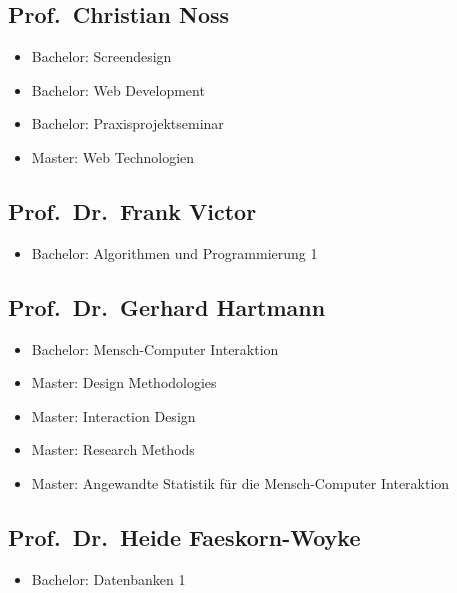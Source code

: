 \subsection{Prof.~Christian Noss}\label{prof.christian-noss}

\begin{itemize}
\tightlist
\item
  Bachelor: Screendesign
\item
  Bachelor: Web Development
\item
  Bachelor: Praxisprojektseminar
\item
  Master: Web Technologien
\end{itemize}

\subsection{Prof.~Dr.~Frank Victor}\label{prof.dr.frank-victor}

\begin{itemize}
\tightlist
\item
  Bachelor: Algorithmen und Programmierung 1
\end{itemize}

\subsection{Prof.~Dr.~Gerhard
Hartmann}\label{prof.dr.gerhard-hartmann}

\begin{itemize}
\tightlist
\item
  Bachelor: Mensch-Computer Interaktion
\item
  Master: Design Methodologies
\item
  Master: Interaction Design
\item
  Master: Research Methods
\item
  Master: Angewandte Statistik für die Mensch-Computer Interaktion
\end{itemize}

\subsection{Prof.~Dr.~Heide
Faeskorn-Woyke}\label{prof.dr.heide-faeskorn-woyke}

\begin{itemize}
\tightlist
\item
  Bachelor: Datenbanken 1
\end{itemize}


